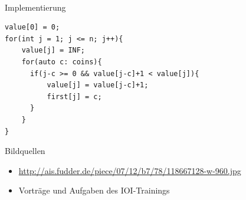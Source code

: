 \documentclass[hyphens,compress,fleqn]{beamer}
\begin{document}
	\begin{frame}[fragile]{{\footnotesize\insertsectionhead\\}Implementierung}
	\begin{verbatim}
value[0] = 0;
for(int j = 1; j <= n; j++){
	value[j] = INF;
	for(auto c: coins){
	  if(j-c >= 0 && value[j-c]+1 < value[j]){
		  value[j] = value[j-c]+1;
		  first[j] = c;
	  }
	}
}
	\end{verbatim}
	\end{frame}

	\begin{frame}[plain]{Bildquellen}
		\begin{itemize}
			\item \url{http://ais.fudder.de/piece/07/12/b7/78/118667128-w-960.jpg}
			\item Vorträge und Aufgaben des IOI-Trainings
		\end{itemize}
	\end{frame}
\end{document}
